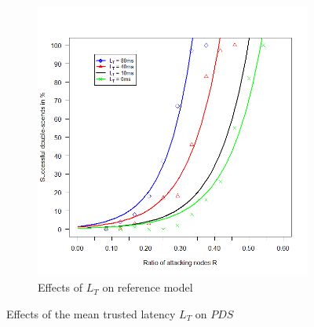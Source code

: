 \documentclass[a4paper,12pt,twoside]{report}
\begin{document}
\begin{figure}[hb]
\begin{subfigure}{.5\textwidth}
  \includegraphics[width=\linewidth]{Experiments/TruLatency/trurat.png}
  \caption{Effects of $L_{T}$ on reference model}
  \label{trulat:b}
\end{subfigure}
\caption{Effects of the mean trusted latency $L_{T}$ on $PDS$}
\label{trulat}
\end{figure}
\end{document}
